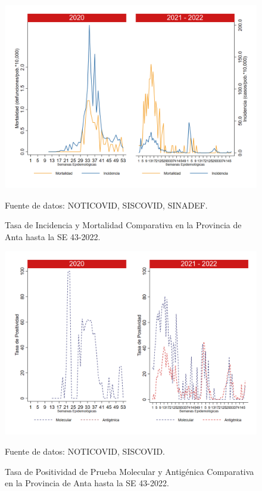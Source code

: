\documentclass[12pt,a4paper,openany]{book}
\begin{document}
	\begin{figure}[h]
		\caption{Tasa de Incidencia y Mortalidad Comparativa en la Provincia de Anta hasta la SE 43-2022.}\label{fig:inc_mort_anta}
		\begin{center}
			\includegraphics[width=0.85\linewidth]{../figuras/incidencia_mortalidad_20_21_2.png}
		\end{center}
		{\footnotesize {Fuente de datos: NOTICOVID, SISCOVID, SINADEF.}}
	\end{figure}
	
	\begin{figure}[h]
		\caption{Tasa de Positividad de Prueba Molecular y Antigénica Comparativa en la Provincia de Anta hasta la SE 43-2022.}\label{fig:positividad_anta}
		\begin{center}
			\includegraphics[width=0.7\linewidth]{../figuras/positividad_20_21_2.png}
		\end{center}
		{\footnotesize {Fuente de datos: NOTICOVID, SISCOVID.}}
	\end{figure}
	
\end{document}
